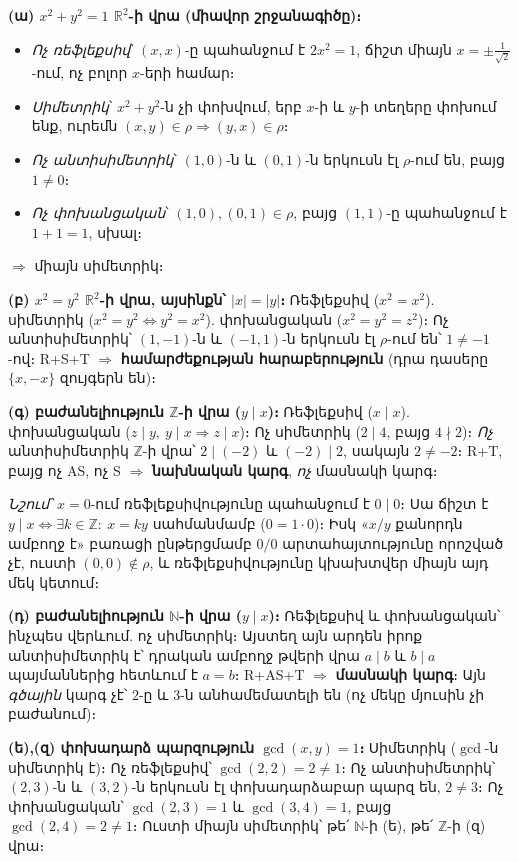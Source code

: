 \documentclass[11pt,a4paper]{article}
\newcommand{\Z}{\mathbb{Z}}
\newcommand{\R}{\mathbb{R}}
\newcommand{\N}{\mathbb{N}}
\begin{document}
\textbf{(ա) $x^2+y^2=1$ $\R^2$-ի վրա (միավոր շրջանագիծը)։}
\begin{itemize}[leftmargin=1.4em,nosep]
\item \emph{Ոչ ռեֆլեքսիվ}՝ $(x,x)$-ը պահանջում է $2x^2=1$, ճիշտ միայն $x=\pm\tfrac1{\sqrt2}$-ում, ոչ
բոլոր $x$-երի համար։
\item \emph{Սիմետրիկ}՝ $x^2+y^2$-ն չի փոխվում, երբ $x$-ի և $y$-ի տեղերը փոխում ենք, ուրեմն $(x,y)\in\rho\Rightarrow(y,x)\in\rho$։
\item \emph{Ոչ անտիսիմետրիկ}՝ $(1,0)$-ն և $(0,1)$-ն երկուսն էլ $\rho$-ում են, բայց $1\neq0$։
\item \emph{Ոչ փոխանցական}՝ $(1,0),(0,1)\in\rho$, բայց $(1,1)$-ը պահանջում է $1+1=1$, սխալ։
\end{itemize}
$\Rightarrow$ միայն սիմետրիկ։

\textbf{(բ) $x^2=y^2$ $\R^2$-ի վրա, այսինքն՝ $|x|=|y|$։}
Ռեֆլեքսիվ ($x^2=x^2$). սիմետրիկ ($x^2=y^2\iff y^2=x^2$). փոխանցական ($x^2=y^2=z^2$)։ Ոչ անտիսիմետրիկ՝
$(1,-1)$-ն և $(-1,1)$-ն երկուսն էլ $\rho$-ում են՝ $1\neq-1$-ով։ R+S+T $\Rightarrow$
\textbf{համարժեքության հարաբերություն} (դրա դասերը $\{x,-x\}$ զույգերն են)։

\textbf{(գ) բաժանելիություն $\Z$-ի վրա ($y\mid x$)։}
Ռեֆլեքսիվ ($x\mid x$). փոխանցական ($z\mid y,\ y\mid x\Rightarrow z\mid x$)։ Ոչ սիմետրիկ ($2\mid 4$,
բայց $4\nmid 2$)։ \emph{Ոչ} անտիսիմետրիկ $\Z$-ի վրա՝ $2\mid(-2)$ և $(-2)\mid2$, սակայն $2\neq-2$։
R+T, բայց ոչ AS, ոչ S $\Rightarrow$ \textbf{նախնական կարգ}, \emph{ոչ} մասնակի կարգ։

{\small \emph{Նշում՝} $x=0$-ում ռեֆլեքսիվությունը պահանջում է $0\mid 0$։ Սա ճիշտ է
$y\mid x\iff \exists k\in\Z:\ x=ky$ սահմանմամբ ($0=1\cdot 0$)։ Իսկ «$x/y$ քանորդն ամբողջ է» բառացի
ընթերցմամբ $0/0$ արտահայտությունը որոշված չէ, ուստի $(0,0)\notin\rho$, և ռեֆլեքսիվությունը կխախտվեր
միայն այդ մեկ կետում։\par}

\textbf{(դ) բաժանելիություն $\N$-ի վրա ($y\mid x$)։}
Ռեֆլեքսիվ և փոխանցական՝ ինչպես վերևում. ոչ սիմետրիկ։ Այստեղ այն արդեն իրոք անտիսիմետրիկ է՝ դրական ամբողջ
թվերի վրա $a\mid b$ և $b\mid a$ պայմաններից հետևում է $a=b$։ R+AS+T $\Rightarrow$ \textbf{մասնակի կարգ}։ Այն
\emph{գծային} կարգ չէ՝ $2$-ը և $3$-ն անհամեմատելի են (ոչ մեկը մյուսին չի բաժանում)։

\textbf{(ե),(զ) փոխադարձ պարզություն $\gcd(x,y)=1$։}
Սիմետրիկ ($\gcd$-ն սիմետրիկ է)։ Ոչ ռեֆլեքսիվ՝ $\gcd(2,2)=2\neq1$։ Ոչ անտիսիմետրիկ՝ $(2,3)$-ն և $(3,2)$-ն
երկուսն էլ փոխադարձաբար պարզ են, $2\neq3$։ Ոչ փոխանցական՝ $\gcd(2,3)=1$ և $\gcd(3,4)=1$, բայց
$\gcd(2,4)=2\neq1$։ Ուստի միայն սիմետրիկ՝ թե՛ $\N$-ի (ե), թե՛ $\Z$-ի (զ) վրա։
\end{document}

